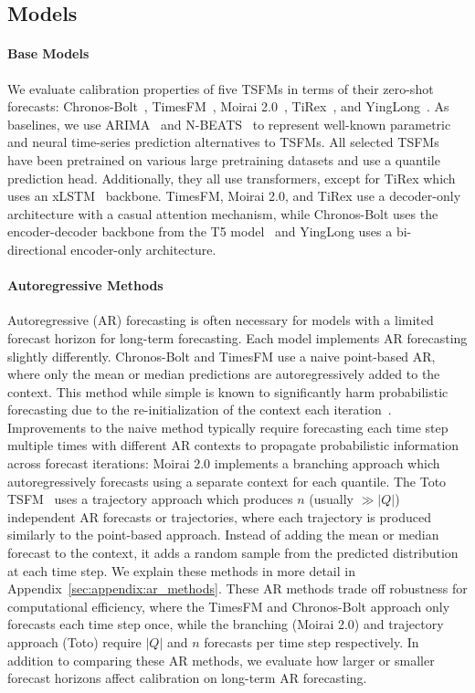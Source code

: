 \documentclass{article}
\begin{document}
\subsection{Models}
\label{sec:models}
\paragraph{Base Models}
We evaluate calibration properties of five TSFMs in terms of their zero-shot forecasts: Chronos-Bolt~\citep{chronos,chronos-bolt}, TimesFM~\citep{timesfm}, Moirai 2.0~\citep{moirai,moirai2}, TiRex~\citep{tirex}, and YingLong~\citep{yinglong}.
As baselines, we use ARIMA~\citep{autoarima} and N-BEATS~\citep{nbeats} to represent well-known parametric and neural time-series prediction alternatives to TSFMs.
All selected TSFMs have been pretrained on various large pretraining datasets and use a quantile prediction head.
Additionally, they all use transformers, except for TiRex which uses an xLSTM~\citep{xlstm} backbone. 
TimesFM, Moirai 2.0, and TiRex use a decoder-only architecture with a casual attention mechanism, while Chronos-Bolt uses the encoder-decoder backbone from the T5 model~\citep{t5llm} and YingLong uses a bi-directional encoder-only architecture. 

\paragraph{Autoregressive Methods}
Autoregressive (AR) forecasting is often necessary for models with a limited forecast horizon for long-term forecasting. 
Each model implements AR forecasting slightly differently. 
Chronos-Bolt and TimesFM use a naive point-based AR, where only the mean or median predictions are autoregressively added to the context.
This method while simple is known to significantly harm probabilistic forecasting due to the re-initialization of the context each iteration~\citep{tirex}.
Improvements to the naive method typically require forecasting each time step multiple times with different AR contexts to propagate probabilistic information across forecast iterations:
Moirai 2.0 implements a branching approach which autoregressively forecasts using a separate context for each quantile.
The Toto TSFM~\citep{toto} uses a trajectory approach which produces $n$ (usually $\gg |Q|$) independent AR forecasts or trajectories, where each trajectory is produced similarly to the point-based approach.
Instead of adding the mean or median forecast to the context, it adds a random sample from the predicted distribution at each time step.
We explain these methods in more detail in Appendix~\ref{sec:appendix:ar_methods}.
These AR methods trade off robustness for computational efficiency, where the TimesFM and Chronos-Bolt approach only forecasts each time step once, while the branching (Moirai 2.0) and trajectory approach (Toto) require $|Q|$ and $n$ forecasts per time step respectively.
In addition to comparing these AR methods, we evaluate how larger or smaller forecast horizons affect calibration on long-term AR forecasting. 
\end{document}
